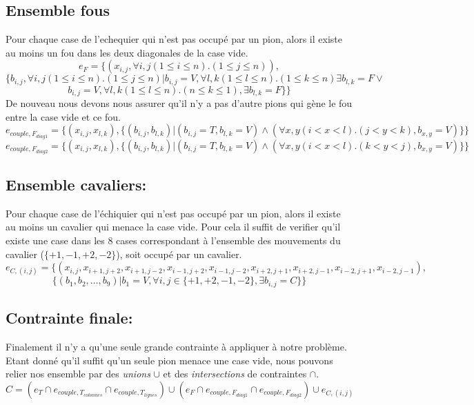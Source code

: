 \documentclass[a4paper,10pt]{article}
\begin{document}
	\subsection{Ensemble fous}
		Pour chaque case de l'echequier qui n'est pas occupé par un pion, alors il existe au moins un fou dans les deux diagonales de la case vide.
		$$ e_F = \{(x_{i,j}, \forall i,j (1 \leq i \leq n).(1 \leq j \leq n)),$$ $$\{b_{i,j},\forall i,j (1 \leq i \leq n).(1 \leq j \leq n)|b_{i,j} = V, \forall l,k (1 \leq l \leq n).(1 \leq k \leq n) \exists b_{l,k} = F \lor$$ $$b_{i,j} = V, \forall l,k (1 \leq l \leq n).(n \leq k \leq 1), \exists b_{l,k} = F\}\}  $$
			De nouveau nous devons nous assurer qu'il n'y a pas d'autre pions qui gène le fou entre la case vide et ce fou.
		$$ e_{couple,F_{diag1}} = \{(x_{i,j}, x_{l,k}), \{(b_{i,j}, b_{l,k})|(b_{i,j} = T, b_{l,k} = V) \land ( \forall x,y (i < x < l).(j < y < k), b_{x,y} = V) \}\}$$
		$$ e_{couple,F_{diag2}} = \{(x_{i,j}, x_{l,k}), \{(b_{i,j}, b_{l,k})|(b_{i,j} = T, b_{l,k} = V) \land ( \forall x,y (i < x < l).(k < y < j), b_{x,y} = V) \}\}$$

	\subsection{Ensemble cavaliers:}
			Pour chaque case de l'échiquier qui n'est pas occupé par un pion, alors il existe au moins un cavalier qui menace la case vide. Pour cela il suffit de verifier qu'il existe une case dans les 8 cases correspondant à l'ensemble des mouvements du cavalier ($\{+1,-1,+2,-2\}$), soit occupé par un cavalier.
	$$ e_{C,(i,j)} = \{(x_{i,j}, x_{i+1,j+2}, x_{i+1,j-2}, x_{i-1,j+2}, x_{i-1,j-2}, x_{i+2,j+1}, x_{i+2,j-1}, x_{i-2,j+1}, x_{i-2,j-1}),$$ $$\{(b_1, b_2, \ldots, b_9)|b_1 = V, \forall i,j \in \{+1,+2,-1,-2\}, \exists b_{i,j} = C\}\} $$

	\subsection{Contrainte finale:}
		Finalement il n'y a qu'une seule grande contrainte à appliquer à notre problème. Etant donné qu'il suffit qu'un seule pion menace une case vide, nous pouvons relier nos ensemble par des \emph{unions} $\cup$ et des \emph{intersections} de contraintes $\cap$. 
	$$ C = (e_T \cap e_{couple,T_{colonnes}} \cap e_{couple,T_{lignes}}) \cup (e_F \cap e_{couple,F_{diag1}} \cap e_{couple,F_{diag2}}) \cup e_{C,(i,j)}$$
\end{document}
